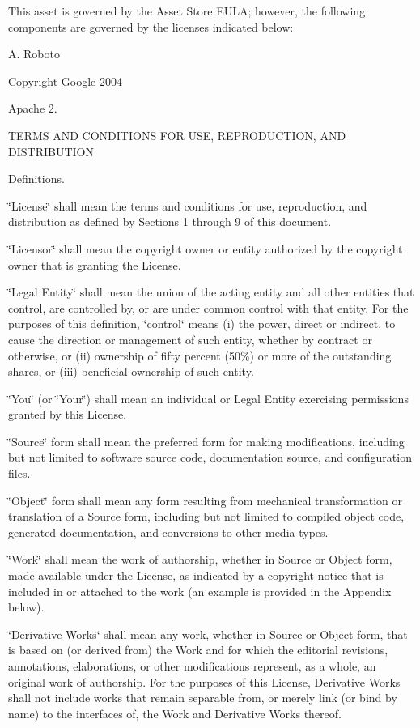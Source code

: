 This asset is governed by the Asset Store E\+U\+LA; however, the following components are governed by the licenses indicated below\+:

A. Roboto

Copyright Google 2004

Apache 2.

T\+E\+R\+MS A\+ND C\+O\+N\+D\+I\+T\+I\+O\+NS F\+OR U\+SE, R\+E\+P\+R\+O\+D\+U\+C\+T\+I\+ON, A\+ND D\+I\+S\+T\+R\+I\+B\+U\+T\+I\+ON


\begin{DoxyEnumerate}
\item Definitions.

\char`\"{}\+License\char`\"{} shall mean the terms and conditions for use, reproduction, and distribution as defined by Sections 1 through 9 of this document.

\char`\"{}\+Licensor\char`\"{} shall mean the copyright owner or entity authorized by the copyright owner that is granting the License.

\char`\"{}\+Legal Entity\char`\"{} shall mean the union of the acting entity and all other entities that control, are controlled by, or are under common control with that entity. For the purposes of this definition, \char`\"{}control\char`\"{} means (i) the power, direct or indirect, to cause the direction or management of such entity, whether by contract or otherwise, or (ii) ownership of fifty percent (50\%) or more of the outstanding shares, or (iii) beneficial ownership of such entity.

\char`\"{}\+You\char`\"{} (or \char`\"{}\+Your\char`\"{}) shall mean an individual or Legal Entity exercising permissions granted by this License.

\char`\"{}\+Source\char`\"{} form shall mean the preferred form for making modifications, including but not limited to software source code, documentation source, and configuration files.

\char`\"{}\+Object\char`\"{} form shall mean any form resulting from mechanical transformation or translation of a Source form, including but not limited to compiled object code, generated documentation, and conversions to other media types.

\char`\"{}\+Work\char`\"{} shall mean the work of authorship, whether in Source or Object form, made available under the License, as indicated by a copyright notice that is included in or attached to the work (an example is provided in the Appendix below).

\char`\"{}\+Derivative Works\char`\"{} shall mean any work, whether in Source or Object form, that is based on (or derived from) the Work and for which the editorial revisions, annotations, elaborations, or other modifications represent, as a whole, an original work of authorship. For the purposes of this License, Derivative Works shall not include works that remain separable from, or merely link (or bind by name) to the interfaces of, the Work and Derivative Works thereof.


\end{DoxyEnumerate}
